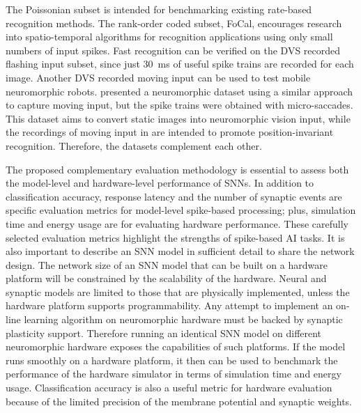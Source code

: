 The Poissonian subset is intended for benchmarking existing rate-based recognition methods.
The rank-order coded subset, FoCal, encourages research into spatio-temporal algorithms for recognition applications using only small numbers of input spikes.
Fast recognition can be verified on the DVS recorded flashing input subset, since just 30~ms of useful spike trains are recorded for each image.
Another DVS recorded moving input can be used to test mobile neuromorphic robots.
\citet{orchard2015convert} presented a neuromorphic dataset using a similar approach to capture moving input, but the spike trains were obtained with micro-saccades.
This dataset aims to convert static images into neuromorphic vision input, while the recordings of moving input in \DIFdelbegin {}\DIFdelend \DIFaddbegin {}\DIFaddend are intended to promote position-invariant recognition.
Therefore, the datasets complement each other.

The proposed complementary evaluation methodology is essential to assess both the model-level and hardware-level performance of SNNs.
In addition to classification accuracy, response latency and the number of synaptic events are specific evaluation metrics for model-level spike-based processing;
plus, simulation time and energy usage are for evaluating hardware performance.
These carefully selected evaluation metrics highlight the strengths of spike-based AI tasks.
It is also important to describe an SNN model in sufficient detail to share the network design. 
The network size of an SNN model that can be built on a hardware platform will be constrained by the scalability of the hardware.
Neural and synaptic models are limited to those that are physically implemented, unless the hardware platform supports programmability.
Any attempt to implement an on-line learning algorithm on neuromorphic hardware must be backed by synaptic plasticity support.
Therefore running an identical SNN model on different neuromorphic hardware exposes the capabilities of such platforms.
If the model runs smoothly on a hardware platform, it then can be used to benchmark the performance of the hardware simulator in terms of simulation time and energy usage.
Classification accuracy is also a useful metric for hardware evaluation because of the limited precision of the membrane potential and synaptic weights.


